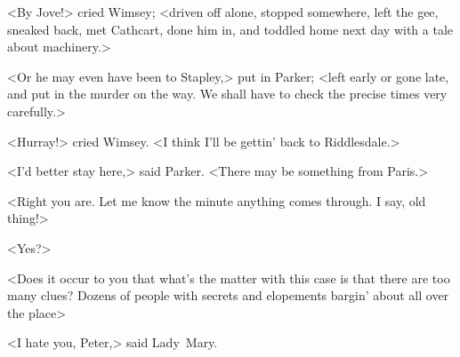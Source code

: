 <By Jove!> cried Wimsey; <driven off alone, stopped somewhere, left the gee, sneaked back, met Cathcart, done him in, and toddled home next day with a tale about machinery.>

<Or he may even have been to Stapley,> put in Parker; <left early or gone late, and put in the murder on the way. We shall have to check the precise times very carefully.>

<Hurray!> cried Wimsey. <I think I'll be gettin' back to Riddlesdale.>

<I'd better stay here,> said Parker. <There may be something from Paris.>

<Right you are. Let me know the minute anything comes through. I say, old thing!>

\makeatletter
{}
{%
	\enlargethispage{\baselineskip}
}{%
}
\makeatother

<Yes?>

<Does it occur to you that what's the matter with this case is that there are too many clues? Dozens of people with secrets and elopements bargin' about all over the place\longdash>

<I hate you, Peter,> said Lady~Mary.
